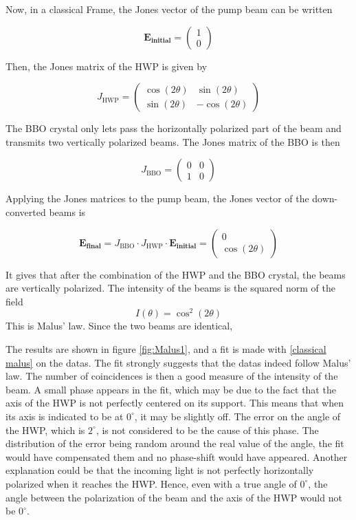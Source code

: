 \documentclass[a4paper, 12pt,oneside]{article}
\begin{document}
Now, in a classical Frame, the Jones vector of the pump beam can be written

$$\mathbf{E_{\text{initial}}} = \begin{pmatrix} 1 \\ 0 \end{pmatrix}$$ 

Then, the Jones matrix of the HWP is given by

$$J_\text{{HWP}} = \begin{pmatrix} \cos(2\theta) & \sin(2\theta) \\ \sin(2\theta) & -\cos(2\theta) \end{pmatrix}$$ 

The BBO crystal only lets pass the horizontally polarized part of the beam and transmits two vertically polarized beams. The Jones matrix of the BBO is then

$$J_\text{{BBO}} = \begin{pmatrix} 0 & 0 \\ 1 & 0 \end{pmatrix}$$ 

Applying the Jones matrices to the pump beam, the Jones vector of the down-converted beams is 

\begin{equation}
    \mathbf{E_\text{{final}}} = J_\text{{BBO}} \cdot J_\text{{HWP}} \cdot \mathbf{E_\text{{initial}}} = \begin{pmatrix} 0 \\ \cos(2\theta) \end{pmatrix}
\end{equation}

It gives that after the combination of the HWP and the BBO crystal, the beams are vertically polarized. The intensity of the beams is the squared norm of the field 
\begin{equation}
    I(\theta) = \cos^2(2\theta)
    \label{classical malus}
\end{equation}
This is Malus' law. Since the two beams are identical, 

The results are shown in figure \ref{fig:Malus1}, and a fit is made with \eqref{classical malus} on the datas. The fit strongly suggests that the datas indeed follow Malus' law. The number of coincidences is then a good measure of the intensity of the beam. A small phase appears in the fit, which may be due to the fact that the axis of the HWP is not perfectly centered on its support. This means that when its axis is indicated to be at $0^{\circ}$, it may be slightly off. The error on the angle of the HWP, which is $2^{\circ}$, is not considered to be the cause of this phase. The distribution of the error being random around the real value of the angle, the fit would have compensated them and no phase-shift would have appeared. Another explanation could be that the incoming light is not perfectly horizontally polarized when it reaches the HWP. Hence, even with a true angle of $0^{\circ}$, the angle between the polarization of the beam and the axis of the HWP would not be $0^{\circ}$.
\end{document}
